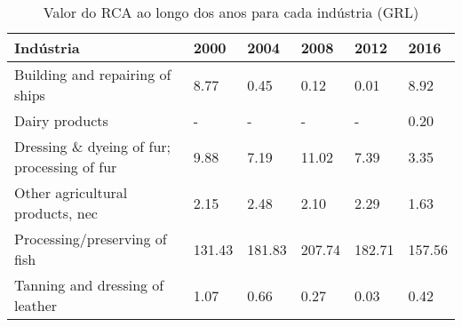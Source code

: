 \begin{table}
\centering
\caption{Valor do RCA ao longo dos anos para cada indústria (GRL)}
\begin{tabular}{p{6cm}p{1.5cm}p{1.5cm}p{1.5cm}p{1.5cm}p{1.5cm}}
\toprule
                                  Indústria &   2000 &   2004 &   2008 &   2012 &   2016 \\
\midrule
            Building and repairing of ships &   8.77 &   0.45 &   0.12 &   0.01 &   8.92 \\
                             Dairy products &      - &      - &      - &      - &   0.20 \\
Dressing \& dyeing of fur; processing of fur &   9.88 &   7.19 &  11.02 &   7.39 &   3.35 \\
           Other agricultural products, nec &   2.15 &   2.48 &   2.10 &   2.29 &   1.63 \\
              Processing/preserving of fish & 131.43 & 181.83 & 207.74 & 182.71 & 157.56 \\
            Tanning and dressing of leather &   1.07 &   0.66 &   0.27 &   0.03 &   0.42 \\
\bottomrule
\end{tabular}
\end{table}
